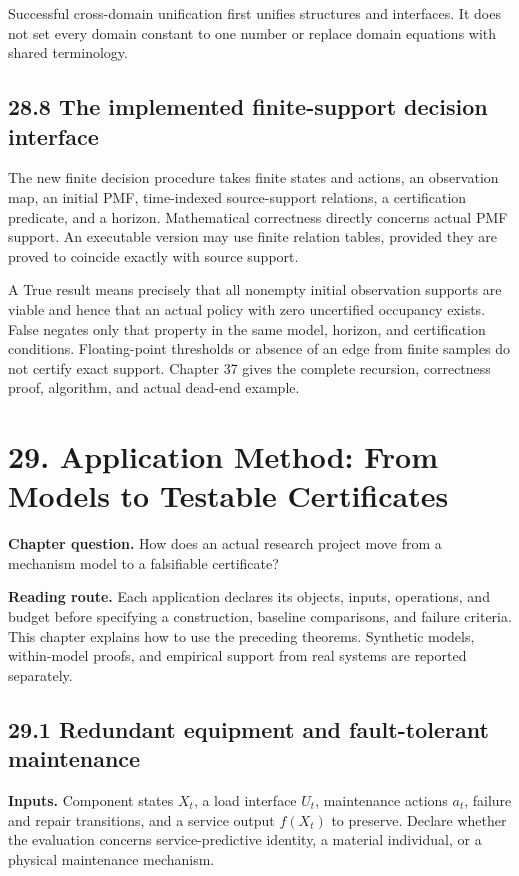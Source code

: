\documentclass[
  english,
  11pt,
  oneside]{book}
\newcounter{none} %
\begin{document}
Successful cross-domain unification first unifies structures and interfaces. It does not set every domain constant to one number or replace domain equations with shared terminology.

\section{28.8 The implemented finite-support decision interface}\label{the-implemented-finite-support-decision-interface}

The new finite decision procedure takes finite states and actions, an observation map, an initial PMF, time-indexed source-support relations, a certification predicate, and a horizon. Mathematical correctness directly concerns actual PMF support. An executable version may use finite relation tables, provided they are proved to coincide exactly with source support.

A True result means precisely that all nonempty initial observation supports are viable and hence that an actual policy with zero uncertified occupancy exists. False negates only that property in the same model, horizon, and certification conditions. Floating-point thresholds or absence of an edge from finite samples do not certify exact support. Chapter 37 gives the complete recursion, correctness proof, algorithm, and actual dead-end example.

\chapter{29. Application Method: From Models to Testable Certificates}\label{ch-29}

\textbf{Chapter question.} How does an actual research project move from a mechanism model to a falsifiable certificate?

\textbf{Reading route.} Each application declares its objects, inputs, operations, and budget before specifying a construction, baseline comparisons, and failure criteria. This chapter explains how to use the preceding theorems. Synthetic models, within-model proofs, and empirical support from real systems are reported separately.

\section{29.1 Redundant equipment and fault-tolerant maintenance}\label{redundant-equipment-and-fault-tolerant-maintenance}

\textbf{Inputs.} Component states \(X_t\), a load interface \(U_t\), maintenance actions \(a_t\), failure and repair transitions, and a service output \(f(X_t)\) to preserve. Declare whether the evaluation concerns service-predictive identity, a material individual, or a physical maintenance mechanism.
\end{document}
